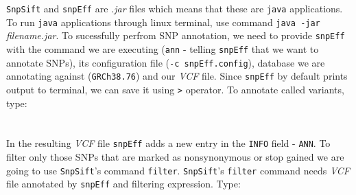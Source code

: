 \texttt{SnpSift} and \texttt{snpEff} are \textit{.jar} files which means that
these are \texttt{java} applications. To run \texttt{java} applications through linux terminal,
use command \texttt{java -jar} \textit{filename.jar}. To sucessfully perfrom SNP
annotation, we need to provide \texttt{snpEff} with the command we are executing 
(\texttt{ann} - telling \texttt{snpEff} that we want to annotate SNPs), its configuration file (\texttt{-c snpEff.config}),
database we are annotating against (\texttt{GRCh38.76}) and our \textit{VCF} file. Since \texttt{snpEff} by default prints
output to terminal, we can save it using \texttt{>} operator.
To annotate called variants, type:\\~\\
\\

In the resulting \textit{VCF} file \texttt{snpEff} adds a new entry in the \texttt{INFO} field - \texttt{ANN}.
To filter only those SNPs that are marked as nonsynonymous or stop gained we are going to
use \texttt{SnpSift}'s command \texttt{filter}. \texttt{SnpSift}'s \texttt{filter} command needs
\textit{VCF} file annotated by \texttt{snpEff} and filtering expression. Type:\\~\\
\\
